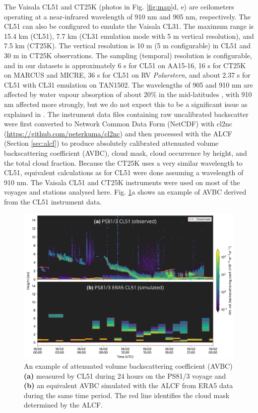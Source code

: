 \documentclass[12pt,a4paper]{article}
\begin{document}
The Vaisala CL51 and CT25K (photos in Fig. \ref{fig:map}d, e) are ceilometers
operating at a near-infrared wavelength of 910 nm and 905 nm, respectively.
The CL51 can also be configured to emulate the Vaisala CL31. The maximum range is
15.4 km (CL51), 7.7 km (CL31 emulation mode with 5 m vertical resolution), and
7.5 km (CT25K). The vertical resolution is 10 m (5 m configurable) in CL51 and
30 m in CT25K observations. The sampling (temporal) resolution is configurable, and in our
datasets is approximately 6 s for CL51 on AA15‐16, 16 s for CT25K on MARCUS and
MICRE, 36 s for CL51 on RV \emph{Polarstern}, and about 2.37 s for CL51 with
CL31 emulation on TAN1502. The wavelengths of 905 and 910 nm are affected by water vapour
absorption of about 20\% in the mid-latitudes \citep{wiegner2015,wiegner2019}, with 910 nm affected more strongly,
but we do not expect this to be a significant issue as explained in
\cite{kuma2021}.  The instrument data files containing raw uncalibrated
backscatter were first converted to Network Common Data Form (NetCDF) with
cl2nc (\url{https://github.com/peterkuma/cl2nc}) and then processed with the
ALCF (Section \ref{sec:alcf}) to produce absolutely calibrated attenuated
volume backscattering coefficient (AVBC), cloud mask, cloud occurrence by
height, and the total cloud fraction. Because the CT25K uses a very similar
wavelength to CL51, equivalent calculations as for CL51 were done assuming a
wavelength of 910 nm. The Vaisala CL51 and CT25K instruments were used on most
of the voyages and stations analysed here. Fig.  \ref{fig:example}a shows an
example of AVBC derived from the CL51 instrument data.

\begin{figure}[b!]
\centering
\includegraphics[width=\textwidth]{img/example.png}
\caption{
An example of attenuated volume backscattering coefficient (AVBC) \textbf{(a)}
measured by CL51 during 24 hours on the PS81/3 voyage and \textbf{(b)} an
equivalent AVBC simulated with the ALCF from ERA5 data during the same time
period. The red line identifies the cloud mask determined by the ALCF.
}
\label{fig:example}
\end{figure}
\end{document}
